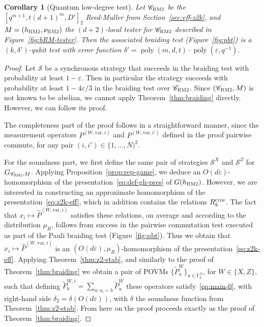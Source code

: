 \documentclass[11pt]{article}
\newtheorem{corollary}[theorem]{Corollary}
\theoremstyle{definition}
\newcommand{\code}{\mathscr{C}}
\newcommand{\strategy}{\mathscr{S}}
\newcommand{\F}{\ensuremath{\mathbb{F}}}
\newcommand{\com}{\textsc{com}}
\newcommand{\bRM}{\ensuremath{\textsc{RM2}}}
\DeclareMathOperator{\poly}{poly}
\newcommand{\eps}{\varepsilon}
\newcommand{\var}{\mathrm{var}}
\begin{document}
\begin{corollary}[Quantum low-degree test]
Let $\code_\bRM$ be the $[q^{m+1},t(d+1)^m,D']_2$ Reed-Muller from Section~\ref{sec:eff-z2k}, and $M=(h_\bRM,\nu_\bRM)$ the $(d+2)$-local tester for $\code_\bRM$ described in Figure~\ref{fig:bRM-tester}. Then the associated braiding test (Figure~\ref{fig:pbt}) is a $(k,\delta')$-qubit test with error function $\delta' = \poly(m,d,t)\cdot\poly(\eps,q^{-1})$.
\end{corollary}

\begin{proof}
Let $\strategy$ be a synchronous strategy that succeeds in the braiding test with probability at least $1-\eps$. Then in particular the strategy succeeds with probability at least $1-4\eps/3$ in the braiding test over $\code_\bRM$. Since $(\code_\bRM,M)$ is not known to be abelian, we cannot apply Theorem~\ref{thm:braiding} directly. However, we can follow its proof. 

The completeness part of the proof follows in a straightforward manner, since the measurement operators $P^{(W,\var,i)}$ and $P^{(W,\var,i')}$ defined in the proof pairwise commute, for any pair $(i,i')\in \{1,\ldots,N)^2$. 

For the soundness part, we first define the same pair of strategies $\strategy^X$ and $\strategy^Z$ for $G_{\code_\bRM,M}$. Applying Proposition~\ref{prop:rep-game}, we deduce an $O(d\eps)$-homomorphism of the presentation~\eqref{eq:def-gh-pres} of $G(h_\bRM)$. However, we are interested in constructing an approximate homomorphism of the presentation~\eqref{eq:z2k-eff}, which in addition contains the relations $R_k^\com$. The fact that $x_i \mapsto \widehat{P}^{(W,\var,i)}$ satisfies these relations, on average and according to the distribution $\mu_R$, follows from success in the pairwise commutation test executed as part of the Pauli braiding test (Figure~\ref{fig:pbt}). Thus we obtain that $x_i \mapsto \widehat{P}^{(W,\var,i)}$ is an $(O(d\eps),\mu_R)$-homomorphism of the presentation~\eqref{eq:z2k-eff}. Applying Theorem~\ref{thm:z2-stab}, and similarly to the proof of Theorem~\ref{thm:braiding} we obtain a pair of POVMs $\{\tilde{P}^W_u\}_{u\in\F_2^N}$, for $W\in\{X,Z\}$, such that defining $\tilde{P}^{W,i}_b = \sum_{u:u_i=b} \tilde{P}^W_u$ these operators satisfy~\eqref{eq:main-0}, with right-hand side $\delta_2 = \delta(O(d\eps))$, with $\delta$ the soundness function from Theorem~\ref{thm:z2-stab}. From here on the proof proceeds exactly as the proof of Theorem~\ref{thm:braiding}. 
\end{proof}
\end{document}
